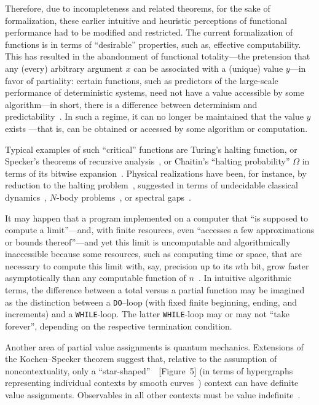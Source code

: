 \documentclass[axioms,article,accept,oneauthor,pdftex]{Definitions/mdpi}
\begin{document}
Therefore, due to incompleteness and related theorems,
for the sake of formalization, these earlier intuitive and heuristic perceptions of functional performance
had to be modified and restricted.
The current formalization of functions is in terms of ``desirable'' properties, such as, effective computability.
This has resulted in the abandonment of functional totality---the pretension that any (every) arbitrary argument $x$ can be associated with a (unique) value $y$---in favor of partiality:
certain functions, such as predictors of the large-scale performance of deterministic systems, need not have
a value accessible by some algorithm---in short,
there is a difference between determinism and predictability~\cite{suppes-1993}.
In such a regime, it can no longer be maintained that the value $y$ exists ---that is,
can be obtained or accessed by some algorithm or computation.

Typical examples of such ``critical'' functions are Turing's halting function,
or Specker's theorems of recursive analysis~\cite{specker57,specker-ges,kreisel},
or Chaitin's ``halting probability'' $\Omega$ in terms of its bitwise expansion~\cite{calude-dinneen06}.
Physical realizations have been, for instance, by reduction to the halting problem~\cite{Yanofsky2016}, suggested in terms of
undecidable classical dynamics~\cite{moore,Bennett1990ud}, $N$-body problems~\cite{svozil-2007-cestial},
or spectral gaps~\cite{cubit-15}.

It may happen that a program implemented on a computer that ``is supposed to compute a limit''---and, with finite resources,
even ``accesses a few approximations or bounds thereof''---and yet this limit is uncomputable and algorithmically inaccessible
because some resources, such as computing time or space, that are necessary to compute this limit with, say,
precision up to its $n$th bit, grow faster asymptotically than any computable function of $n$~\cite{rado}.
In intuitive algorithmic terms, the difference between a total versus a partial function may be
imagined as the distinction between a {\tt DO}--loop (with fixed finite beginning, ending, and increments) and a {\tt WHILE}-loop.
The latter {\tt WHILE}-loop may or may not ``take forever'', depending on the respective termination condition.

Another area of partial value assignments is quantum mechanics.
Extensions of the Kochen--Specker theorem
suggest that, relative to the assumption of noncontextuality, only a ``star-shaped''~\cite{PhysRevA.89.032109}~[Figure~5]
(in terms of hypergraphs~\cite{Bretto-MR3077516}
representing individual contexts by smooth curves~\cite{greechie:71})
context can have definite value assignments.
Observables in all other contexts must be value indefinite~\cite{pitowsky:218,hru-pit-2003,2015-AnalyticKS}.
\end{document}
